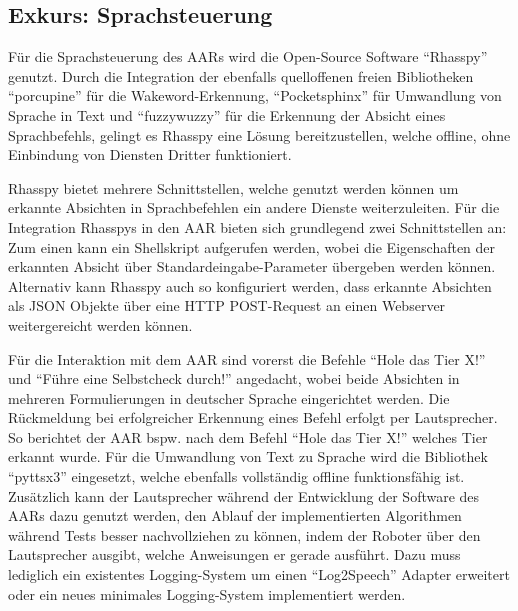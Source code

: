 \subsection{Exkurs: Sprachsteuerung}

Für die Sprachsteuerung des \acp{AAR} wird die Open-Source Software \enquote{Rhasspy} genutzt.
Durch die Integration der ebenfalls quelloffenen freien Bibliotheken \enquote{porcupine} für die Wakeword-Erkennung, \enquote{Pocketsphinx} für Umwandlung von Sprache in Text und \enquote{fuzzywuzzy} für die Erkennung der Absicht eines Sprachbefehls, gelingt es Rhasspy eine Lösung bereitzustellen, welche offline, ohne Einbindung von Diensten Dritter funktioniert.

Rhasspy bietet mehrere Schnittstellen, welche genutzt werden können um erkannte Absichten in Sprachbefehlen ein andere Dienste weiterzuleiten.
Für die Integration Rhasspys in den \ac{AAR} bieten sich grundlegend zwei Schnittstellen an:
Zum einen kann ein Shellskript aufgerufen werden, wobei die Eigenschaften der erkannten Absicht über Standardeingabe-Parameter übergeben werden können.
Alternativ kann Rhasspy auch so konfiguriert werden, dass erkannte Absichten als \ac{JSON} Objekte über eine \ac{HTTP} POST-Request an einen Webserver weitergereicht werden können.

Für die Interaktion mit dem \ac{AAR} sind vorerst die Befehle \enquote{Hole das Tier X!} und \enquote{Führe eine Selbstcheck durch!} angedacht, wobei beide Absichten in mehreren Formulierungen in deutscher Sprache eingerichtet werden.
Die Rückmeldung bei erfolgreicher Erkennung eines Befehl erfolgt per Lautsprecher.
So berichtet der \ac{AAR} bspw. nach dem Befehl \enquote{Hole das Tier X!} welches Tier erkannt wurde.
Für die Umwandlung von Text zu Sprache wird die Bibliothek \enquote{pyttsx3} eingesetzt, welche ebenfalls vollständig offline funktionsfähig ist.
Zusätzlich kann der Lautsprecher während der Entwicklung der Software des \acp{AAR} dazu genutzt werden, den Ablauf der implementierten Algorithmen während Tests besser nachvollziehen zu können, indem der Roboter über den Lautsprecher ausgibt, welche Anweisungen er gerade ausführt.
Dazu muss lediglich ein existentes Logging-System um einen \enquote{Log2Speech} Adapter erweitert oder ein neues minimales Logging-System implementiert werden.
